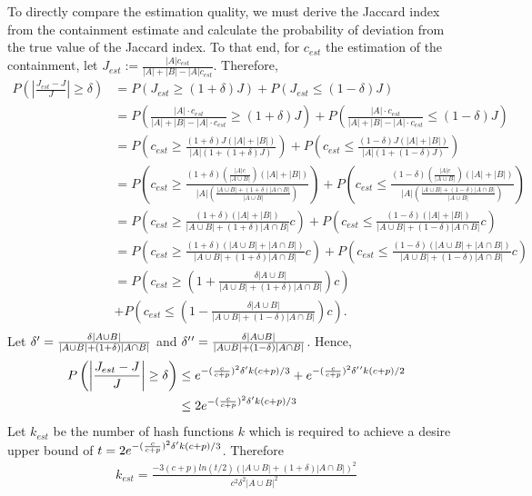 \documentclass[11pt]{amsart}
\theoremstyle{remark}
\numberwithin{equation}{section}
\begin{document}
To directly compare the estimation quality, we must derive the Jaccard index from the containment estimate and calculate the probability of deviation from the true value of the Jaccard index. To that end, for $c_{est}$ the estimation of the containment, let $J_{est}:=\frac{|A|c_{est}}{|A|+|B|-|A|c_{est}}$. Therefore,
\begin{align*}
P\left(\left|\frac{J_{est}-J}{J}\right|\geq \delta\right) &= P(J_{est}\geq (1+\delta)J)+P(J_{est}\leq (1-\delta)J)\\
&= P\left(\frac{|A|\cdot c_{est}}{|A|+|B|-|A|\cdot c_{est}}\geq (1+\delta)J\right)+P\left(\frac{|A|\cdot c_{est}}{|A|+|B|-|A|\cdot c_{est}}\leq (1-\delta)J\right)\\
&= P\left(c_{est}\geq\frac{ (1+\delta)J(|A|+|B|)}{|A|(1+(1+\delta)J)} \right)+P\left(c_{est}\leq\frac{ (1-\delta)J(|A|+|B|)}{|A|(1+(1-\delta)J)} \right)\\
&= P\left(c_{est}\geq\frac{ (1+\delta)(\frac{|A|c}{|A\cup B|})(|A|+|B|)}{|A|(\frac{|A\cup B|+(1+\delta)|A \cap B|}{|A\cup B|})} \right)+P\left(c_{est}\leq\frac{ (1-\delta)(\frac{|A|c}{|A\cup B|})(|A|+|B|)}{|A|(\frac{|A\cup B|+(1-\delta)|A \cap B|}{|A\cup B|})} \right)\\
&= P\left(c_{est}\geq\frac{ (1+\delta)(|A|+|B|)}{|A\cup B|+(1+\delta)|A \cap B|} c \right)+P\left(c_{est}\leq\frac{ (1-\delta)(|A|+|B|)}{|A\cup B|+(1-\delta)|A \cap B|} c \right)\\
&= P\left(c_{est}\geq\frac{ (1+\delta)(|A \cup B|+|A \cap B|)}{|A\cup B|+(1+\delta)|A \cap B|} c \right)+P\left(c_{est}\leq\frac{ (1-\delta)(|A \cup B|+|A \cap B|)}{|A\cup B|+(1-\delta)|A \cap B|} c \right)\\
&= P\left(c_{est}\geq\left(1+\frac{\delta |A \cup B|}{|A\cup B|+(1+\delta)|A \cap B|}\right) c \right)\\
&+P\left(c_{est}\leq\left(1-\frac{ \delta |A \cup B|}{|A\cup B|+(1-\delta)|A \cap B|}\right) c \right).\\
\end{align*}
Let  $\delta\rq{}= \frac{\delta |A \cup B|}{|A\cup B|+(1+\delta)|A \cap B|}$ and $\delta\rq{}\rq{}=\frac{\delta |A \cup B|}{|A\cup B|+(1-\delta)|A \cap B|}$. Hence,
\begin{align*}
P\left(\left|\frac{J_{est}-J}{J}\right|\geq \delta\right) &\leq e^{-(\frac{c}{c+p})^2\delta\rq{}k(c+p)/3}+e^{-(\frac{c}{c+p})^2\delta\rq{}\rq{}k(c+p)/2}\\
&\leq 2e^{-(\frac{c}{c+p})^2\delta\rq{}k(c+p)/3}
\end{align*}
Let $k_{est}$ be the number of hash functions $k$ which is required to achieve a desire upper bound of $t=2e^{-(\frac{c}{c+p})^2\delta\rq{}k(c+p)/3}$. Therefore
 \begin{align}
 \label{eqn:JaccardFromContainment}
 k_{est} =\frac{-3(c+p)ln(t/2)\left(|A\cup B|+(1+\delta)|A\cap B|\right)^2}{c^2\delta^2|A\cup B|^2 }
 \end{align}
 
\end{document}
